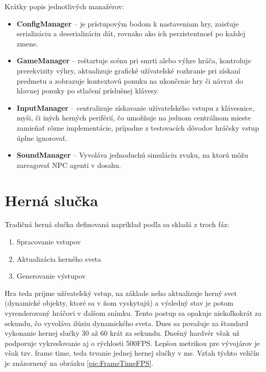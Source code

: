 \documentclass[slovak, master]{diploma}
\begin{document}
Krátky popis jednotlivých manažérov:
\begin{itemize}
  \item \textbf{ConfigManager} -- je prístupovým bodom k nastaveniam hry, zaisťuje serializáciu a deserializáciu dát, rovnako ako ich perzistentnosť po každej zmene.
  \item \textbf{GameManager} -- reštartuje scénu pri smrti alebo výhre hráča, kontroluje prerekvizity výhry, aktualizuje grafické užívateľské rozhranie pri získaní predmetu a zobrazuje kontextovú ponuku na ukončenie hry či návrat do hlavnej ponuky po stlačení príslušnej klávesy.
  \item \textbf{InputManager} -- centralizuje získavanie užívateľského vstupu z klávesnice, myši, či iných herných periférií, čo umožňuje na jednom centrálnom mieste zamieňať rôzne implementácie, prípadne z testovacích dôvodov hráčsky vstup úplne ignorovať. 
  \item \textbf{SoundManager} -- Vyvoláva jednoduchú simuláciu zvuku, na ktorú môžu zareagovať NPC agenti v dosahu.
\end{itemize}

\section{Herná slučka}
\label{sec:GameLoop}
Tradičná herná slučka definovaná napríklad podľa \cite{GameAlgorithms} sa skladá z troch fáz:

\begin{enumerate}
  \item Spracovanie vstupov
  \item Aktualizácia herného sveta
  \item Generovanie výstupov
\end{enumerate}

Hra teda prijme užívateľský vstup, na základe neho aktualizuje herný svet (dynamické objekty, ktoré sa v ňom vyskytujú) a výsledný stav je potom vyrenderovaný hráčovi v ďalšom snímku. Tento postup sa opakuje niekoľkokrát za sekundu, čo vyvoláva ilúziu dynamického sveta. Dnes sa považuje za štandard vykonanie hernej slučky 30 až 60 krát za sekundu. Dnešný hardvér však už podporuje vykresľovanie aj o rýchlosti 500FPS. Lepšou metrikou pre vývojárov je však tzv. frame time, teda trvanie jednej hernej slučky v ms. Vzťah týchto veličín je znázornený na obrázku \ref{pic:FrameTimeFPS}.
\end{document}
